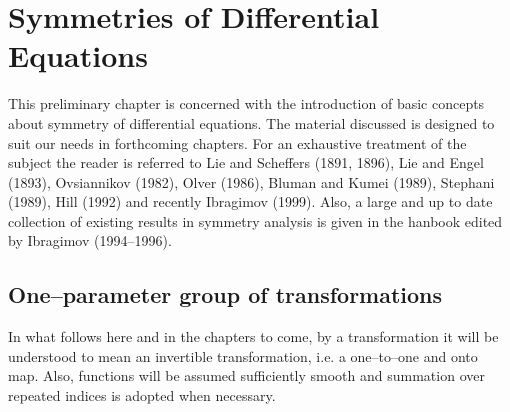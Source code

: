 \setlength{\parindent}{0mm}
\setlength{\parskip}{14pt}
\renewcommand{\baselinestretch}{1.5}
\setlength{\topmargin}{0pt}
\setlength{\headheight}{0pt}
\setlength{\headsep}{0pt}
\setlength{\footskip}{45pt}
\setlength{\footheight}{0pt}
\setlength{\textwidth}{465pt}
\setlength{\textheight}{660pt}
\setlength{\oddsidemargin}{10pt}
\newcommand{\RR}{\mathrm{I\!R\!}}
\newcommand{\FF}{\mathrm{I\!F\!}}
\newcommand{\dt}{\frac{\partial}{\partial t}}
\newcommand{\dq}{\frac{\partial}{\partial q }}
\newcommand{\dr}{\frac{\partial}{\partial p }}
\newtheorem{defi}{Definition}[chapter]
\newtheorem{theo}{Theorem}[chapter]


\chapter{Symmetries of Differential Equations}

This preliminary chapter is concerned with the introduction of basic concepts
about symmetry of differential equations. The material discussed is designed
to suit our needs in forthcoming chapters. For an exhaustive treatment of the
subject the reader is referred to Lie and Scheffers (1891, 1896),
Lie and Engel (1893), 
Ovsiannikov (1982), Olver (1986), Bluman and Kumei (1989), Stephani (1989),
Hill (1992) and recently
Ibragimov (1999). Also, a large and up to date collection of existing results
in symmetry analysis is given in the hanbook edited by Ibragimov (1994--1996).

\section{One--parameter group of transformations}
In what follows here and in the chapters to come, by a transformation it will
be understood  to mean an invertible transformation,
i.e. a one--to--one and onto map. Also, functions will be assumed
sufficiently smooth and summation over repeated indices is adopted when
necessary.

